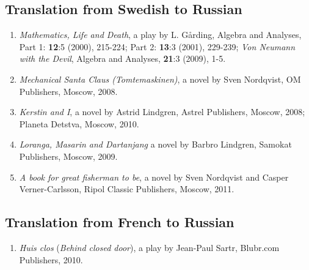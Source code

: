 \documentclass{article}
\begin{document}
\subsection*{Translation  from Swedish to Russian}

\begin{enumerate}
\item {\it Mathematics, Life and Death}, a play by L. G{\aa}rding,
Algebra and Analyses,  Part 1: {\bf 12}:5 (2000), 215-224; Part 2:
{\bf 13}:3
(2001), 229-239; {\it Von Neumann with the Devil}, Algebra and Analyses, {\bf 21}:3 (2009), 1-5.

\item {\it Mechanical Santa Claus (Tomtemaskinen)}, a novel by Sven Nordqvist, OM Publishers, Moscow, 2008.


\item {\it Kerstin and I}, a novel by Astrid Lindgren, Astrel Publishers, Moscow, 2008; Planeta Detstva, Moscow, 2010.

\item  {\it Loranga, Masarin and Dartanjang} a novel by Barbro Lindgren, Samokat Publishers, Moscow, 2009.

\item {\it A book for great fisherman to be}, a novel by Sven Nordqvist and Casper Verner-Carlsson, Ripol Classic Publishers, Moscow, 2011.
\end{enumerate}

\subsection*{Translation  from French to Russian}
\begin{enumerate}
\item {\it Huis clos} ({\it Behind closed door}), a play by Jean-Paul Sartr, Blubr.com Publishers, 2010.
\end{enumerate}
\end{document}
